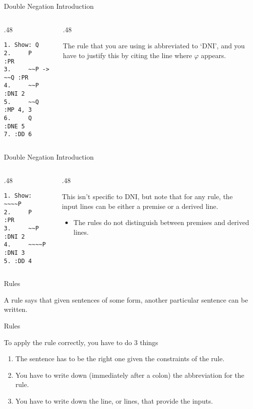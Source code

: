 \documentclass[
  ignorenonframetext,
]{beamer}
\providecommand{\tightlist}{%
  \setlength{\itemsep}{0pt}\setlength{\parskip}{0pt}}
\renewcommand{\,}{\text{, }}
\def\begincols{\begin{columns}}
\def\begincol{\begin{column}}
\def\endcol{\end{column}}
\def\endcols{\end{columns}}
\begin{document}
\begin{frame}[fragile]{Double Negation Introduction}
\protect\hypertarget{double-negation-introduction-1}{}

\begincols
\begincol{.48\textwidth}

\begin{verbatim}
1. Show: Q
2.     P          :PR
3.     ~~P -> ~~Q :PR
4.     ~~P        :DNI 2
5.     ~~Q        :MP 4, 3
6.     Q          :DNE 5
7. :DD 6
\end{verbatim}

\endcol
\begincol{.48\textwidth}

The rule that you are using is abbreviated to `DNI', and you have to
justify this by citing the line where \(\varphi\) appears.

\endcol
\endcols

\end{frame}

\begin{frame}[fragile]{Double Negation Introduction}
\protect\hypertarget{double-negation-introduction-2}{}

\begincols
\begincol{.48\textwidth}

\begin{verbatim}
1. Show: ~~~~P
2.     P          :PR
3.     ~~P        :DNI 2
4.     ~~~~P      :DNI 3
5. :DD 4
\end{verbatim}

\endcol
\begincol{.48\textwidth}

This isn't specific to DNI, but note that for any rule, the input lines
can be either a premise or a derived line.

\begin{itemize}
\tightlist
\item
  The rules do not distinguish between premises and derived lines.
\end{itemize}

\endcol
\endcols

\end{frame}

\begin{frame}{Rules}
\protect\hypertarget{rules}{}

A rule says that given sentences of some form, another particular
sentence can be written.

\end{frame}

\begin{frame}{Rules}
\protect\hypertarget{rules-1}{}

To apply the rule correctly, you have to do 3 things

\begin{enumerate}
\tightlist
\item
  The sentence has to be the right one given the constraints of the
  rule.
\item
  You have to write down (immediately after a colon) the abbreviation
  for the rule.
\item
  You have to write down the line, or lines, that provide the inputs.
\end{enumerate}

\end{frame}
\end{document}
